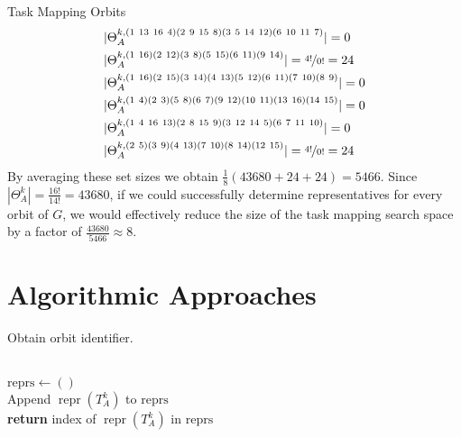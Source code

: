 \begin{exmp}{Task Mapping Orbits}
\begin{equation*}
\begin{split}
      &|\Theta_A^{k,(1\ 13\ 16\ 4)(2\ 9\ 15\ 8)(3\ 5\ 14\ 12)(6\ 10\ 11\ 7)}| = 0 \\
      &|\Theta_A^{k,(1\ 16)(2\ 12)(3\ 8)(5\ 15)(6\ 11)(9\ 14)}| = \nicefrac{4!}{0!} = 24 \\
      &|\Theta_A^{k,(1\ 16)(2\ 15)(3\ 14)(4\ 13)(5\ 12)(6\ 11)(7\ 10)(8\ 9)}| = 0 \\
      &|\Theta_A^{k,(1\ 4)(2\ 3)(5\ 8)(6\ 7)(9\ 12)(10\ 11)(13\ 16)(14\ 15)}| = 0 \\
      &|\Theta_A^{k,(1\ 4\ 16\ 13)(2\ 8\ 15\ 9)(3\ 12\ 14\ 5)(6\ 7\ 11\ 10)}| = 0 \\
      &|\Theta_A^{k,(2\ 5)(3\ 9)(4\ 13)(7\ 10)(8\ 14)(12\ 15)}| = \nicefrac{4!}{0!} = 24 \\
    \end{split}
  \end{equation*}
  By averaging these set sizes we obtain $\frac{1}{8}(43680 + 24 + 24) = 5466$.
  Since $|\Theta_A^k| = \frac{16!}{14!} = 43680$, if we could successfully
  determine representatives for every orbit of $G$, we would effectively reduce
  the size of the task mapping search space by a factor of $\frac{43680}{5466}
  \approx 8$.
\end{exmp}

\section{Algorithmic Approaches}
\label{sec:tmor_algorithmic_approaches}

\begin{algorithm}
  \caption{Obtain orbit identifier.}
  \label{alg:tmor}
  \begin{algorithmic}[1]
    \\
       \State $\mathrm{reprs} \gets ()$
    \EndIf
    \\
      \State Append $\operatorname{repr}(T_A^k)$ to $\mathrm{reprs}$
    \EndIf
    \\
    \State \textbf{return} index of $\operatorname{repr}(T_A^k)$ in $\mathrm{reprs}$
  \EndProcedure
  \end{algorithmic}
\end{algorithm}

